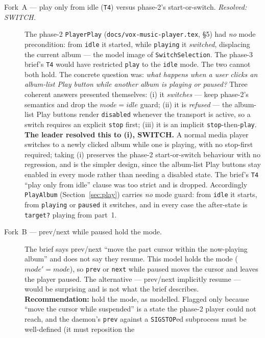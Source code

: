 \documentclass[a4paper,10pt,fleqn]{article}
\begin{document}
\begin{description}
  \item[Fork~A --- play only from idle (\texttt{T4}) versus phase-2's
    start-or-switch. \emph{Resolved: SWITCH.}] The phase-2 \texttt{PlayerPlay}
    (\texttt{docs/vox-music-player.tex}, \S5) had \emph{no} mode precondition: from
    \texttt{idle} it started, while \texttt{playing} it \emph{switched},
    displacing the current album --- the model image of
    \texttt{SwitchSelection}. The phase-3 brief's \texttt{T4} would have
    restricted \texttt{play} to the \texttt{idle} mode. The two cannot both
    hold. The concrete question was: \emph{what happens when a user clicks an
    album-list Play button while another album is playing or paused?} Three
    coherent answers presented themselves: (i) it \emph{switches} --- keep
    phase-2's semantics and drop the $mode = idle$ guard; (ii) it is
    \emph{refused} --- the album-list Play buttons render \texttt{disabled}
    whenever the transport is active, so a switch requires an explicit
    \texttt{stop} first; (iii) it is an implicit \texttt{stop}-then-\texttt{play}.
    \textbf{The leader resolved this to (i), SWITCH.} A normal media player
    switches to a newly clicked album while one is playing, with no stop-first
    required; taking (i) preserves the phase-2 start-or-switch behaviour with no
    regression, and is the simpler design, since the album-list Play buttons
    stay enabled in every mode rather than needing a disabled state. The brief's
    \texttt{T4} ``play only from idle'' clause was too strict and is dropped.
    Accordingly \texttt{PlayAlbum} (Section~\ref{sec:play}) carries \emph{no}
    mode guard: from \texttt{idle} it starts, from \texttt{playing} or
    \texttt{paused} it switches, and in every case the after-state is
    \texttt{target?} playing from part~1.
  \item[Fork~B --- prev/next while paused hold the mode.] The brief says
    prev/next ``move the part cursor within the now-playing album'' and does not
    say they resume. This model holds the mode ($mode' = mode$), so \texttt{prev}
    or \texttt{next} while paused moves the cursor and leaves the player paused.
    The alternative --- prev/next implicitly resume --- would be surprising and is
    not what the brief describes. \textbf{Recommendation:} hold the mode, as
    modelled. Flagged only because ``move the cursor while suspended'' is a state
    the phase-2 player could not reach, and the daemon's \texttt{prev} against a
    \texttt{SIGSTOP}ed subprocess must be well-defined (it must reposition the

\end{description}
\end{document}
